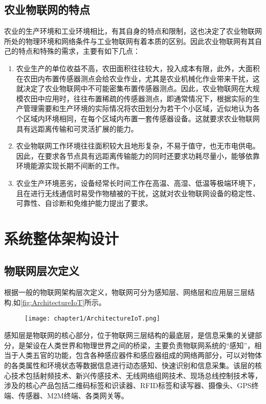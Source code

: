 	\subsection{农业物联网的特点}
	农业的生产环境和工业环境相比，有其自身的特点和限制，这也决定了农业物联网所处的物理环境和网络条件与工业物联网有着本质的区别。因此农业物联网有其自己的特点和特殊的需求，主要有如下几点：
	\begin{enumerate}
  			\item 农业生产的单位收益不高，农田面积往往较大，投入成本有限，此外，大面积在农田内布置传感器测点会给农业作业，尤其是农业机械化作业带来干扰，这就决定了农业物联网中不可能密集布置传感器测点。因此，农业物联网在大规模农田中应用时，往往布置稀疏的传感器测点，即通常情况下，根据实际的生产管理需要和生产环境的实际情况将农田划分为若干个小区域，近似地认为各个区域内环境相同，在每个区域内布置一套传感器设备。这就要求农业物联网具有远距离传输和可灵活扩展的能力。
  			\item 农业物联网工作环境往往面积较大且地形复杂，不易于值守，也无市电供电。因此，在要求各节点具有远距离传输能力的同时还要求功耗尽量小，能够依靠环境能源实现长期不间断的工作。
  			\item 农业生产环境恶劣，设备经常长时间工作在高温、高湿、低温等极端环境下，且在进行无线通信时易受作物植被的干扰，这就对农业物联网设备的稳定性、可靠性、自诊断和免维护能力提出了要求。
	\end{enumerate}

\section{系统整体架构设计}
	\subsection{物联网层次定义}
	根据一般的物联网架构层次定义\supercite{Yu2011Research,LiuQiang2010}，物联网可分为感知层、网络层和应用层三层结构\supercite{HanYi2016A,WangHuaiyu2015},如\ref{fig:ArchitectureIoT}所示。
	\begin{figure}[!htp]
  		\centering
 		\texttt{[image: chapter1/ArchitectureIoT.png]}
	\end{figure}
	感知层是物联网的核心部分，位于物联网三层结构的最底层，是信息采集的关键部分，是架设在人类世界和物理世界之间的桥梁，主要负责物联网系统的“感知”，相当于人类五官的功能，包含各种感应器件和感应器组成的网络两部分，可以对物体的各类属性和环境状态等数据信息进行动态感知、快速识别和信息采集。该层的核心技术包括射频技术、新兴传感技术、无线网络组网技术、现场总线控制技术等，涉及的核心产品包括二维码标签和识读器、RFID标签和读写器、摄像头、GPS终端、传感器、M2M终端、各类网关等。
	
